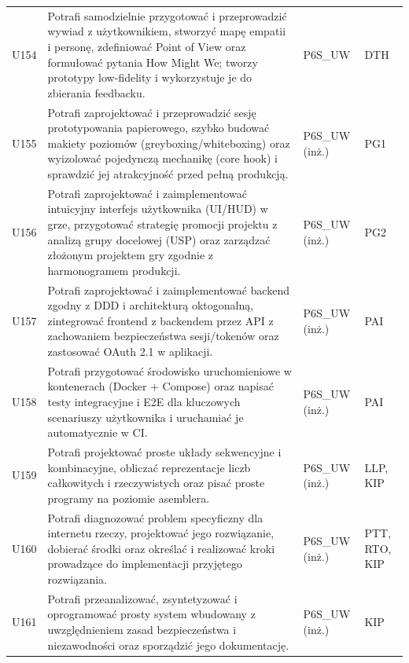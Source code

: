 \documentclass[12pt,a4paper]{article}
\begin{document}
{\begin{longtable}{m{1cm}m{8.8cm}m{2.1cm}m{2.5cm}}
\rowcolor{tableRowAlt} U154 & Potrafi samodzielnie przygotować i przeprowadzić wywiad z użytkownikiem, stworzyć mapę empatii i personę, zdefiniować Point of View oraz formułować pytania How Might We; tworzy prototypy low-fidelity i wykorzystuje je do zbierania feedbacku. & {\scriptsize P6S\_UW} & {\scriptsize DTH} \\
\rowcolor{tableRowLight} U155 & Potrafi zaprojektować i przeprowadzić sesję prototypowania papierowego, szybko budować makiety poziomów (greyboxing/whiteboxing) oraz wyizolować pojedynczą mechanikę (core hook) i sprawdzić jej atrakcyjność przed pełną produkcją. & {\scriptsize P6S\_UW {\scriptsize (inż.)}} & {\scriptsize PG1} \\
\rowcolor{tableRowAlt} U156 & Potrafi zaprojektować i zaimplementować intuicyjny interfejs użytkownika (UI/HUD) w grze, przygotować strategię promocji projektu z analizą grupy docelowej (USP) oraz zarządzać złożonym projektem gry zgodnie z harmonogramem produkcji. & {\scriptsize P6S\_UW {\scriptsize (inż.)}} & {\scriptsize PG2} \\
\rowcolor{tableRowLight} U157 & Potrafi zaprojektować i zaimplementować backend zgodny z DDD i architekturą oktogonalną, zintegrować frontend z backendem przez API z zachowaniem bezpieczeństwa sesji/tokenów oraz zastosować OAuth 2.1 w aplikacji. & {\scriptsize P6S\_UW {\scriptsize (inż.)}} & {\scriptsize PAI} \\
\rowcolor{tableRowAlt} U158 & Potrafi przygotować środowisko uruchomieniowe w kontenerach (Docker + Compose) oraz napisać testy integracyjne i E2E dla kluczowych scenariuszy użytkownika i uruchamiać je automatycznie w CI. & {\scriptsize P6S\_UW {\scriptsize (inż.)}} & {\scriptsize PAI} \\
\rowcolor{tableRowLight} U159 & Potrafi projektować proste układy sekwencyjne i kombinacyjne, obliczać reprezentacje liczb całkowitych i rzeczywistych oraz pisać proste programy na poziomie asemblera. & {\scriptsize P6S\_UW {\scriptsize (inż.)}} & {\scriptsize LLP, KIP} \\
\rowcolor{tableRowAlt} U160 & Potrafi diagnozować problem specyficzny dla internetu rzeczy, projektować jego rozwiązanie, dobierać środki oraz określać i realizować kroki prowadzące do implementacji przyjętego rozwiązania. & {\scriptsize P6S\_UW {\scriptsize (inż.)}} & {\scriptsize PTT, RTO, KIP} \\
\rowcolor{tableRowLight} U161 & Potrafi przeanalizować, zsyntetyzować i oprogramować prosty system wbudowany z uwzględnieniem zasad bezpieczeństwa i niezawodności oraz sporządzić jego dokumentację. & {\scriptsize P6S\_UW {\scriptsize (inż.)}} & {\scriptsize KIP} \\

\end{longtable}}
\end{document}
